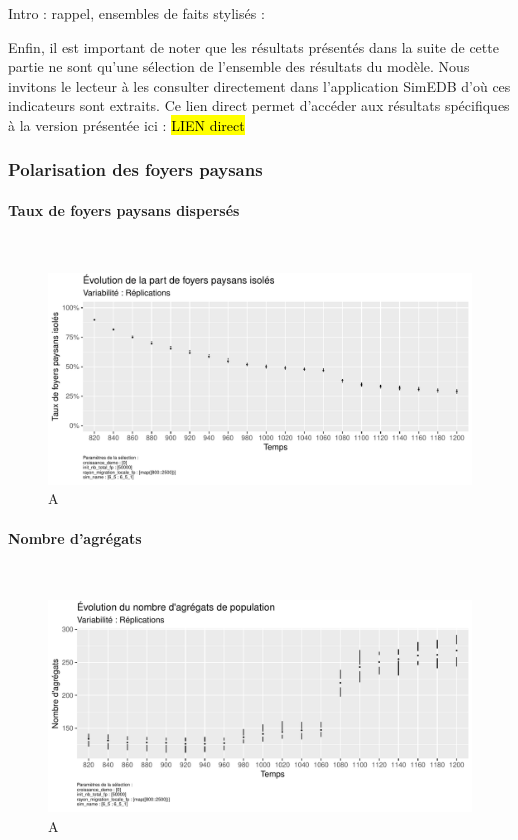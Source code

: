 Intro : rappel,  ensembles de faits stylisés : 


Enfin, il est important de noter que les résultats présentés dans la suite de cette partie ne sont qu'une sélection de l'ensemble des résultats du modèle.
Nous invitons le lecteur à les consulter directement dans l'application SimEDB d'où ces indicateurs sont extraits.
Ce lien direct permet d'accéder aux résultats spécifiques à la version présentée ici : \hl{LIEN direct}





\subsubsection{Polarisation des foyers paysans}

\paragraph{Taux de foyers paysans dispersés}~\\

\begin{figure}[H]
	\centering
	\includegraphics[width=\linewidth]{img/results_6_5_1/FP_Concentration_Haut.pdf}
	\caption{A}
	\label{}
\end{figure}

\paragraph{Nombre d’agrégats}~\\

\begin{figure}[H]
	\centering
	\includegraphics[width=\linewidth]{img/results_6_5_1/Agregats_Nb_Haut.pdf}
	\caption{A}
	\label{}
\end{figure}

